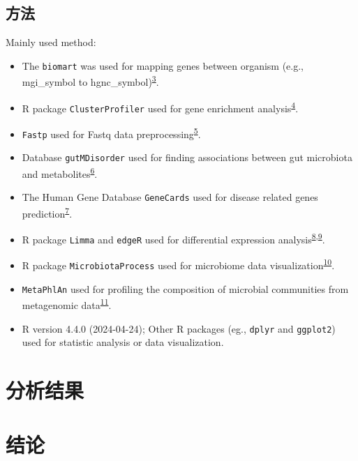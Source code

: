 \documentclass[
]{article}
\providecommand{\tightlist}{%
  \setlength{\itemsep}{0pt}\setlength{\parskip}{0pt}}
\begin{document}
\hypertarget{ux65b9ux6cd5}{%
\subsection{方法}\label{ux65b9ux6cd5}}

Mainly used method:

\begin{itemize}
\tightlist
\item
  The \texttt{biomart} was used for mapping genes between organism (e.g., mgi\_symbol to hgnc\_symbol)\textsuperscript{\protect\hyperlink{ref-MappingIdentifDurinc2009}{3}}.
\item
  R package \texttt{ClusterProfiler} used for gene enrichment analysis\textsuperscript{\protect\hyperlink{ref-ClusterprofilerWuTi2021}{4}}.
\item
  \texttt{Fastp} used for Fastq data preprocessing\textsuperscript{\protect\hyperlink{ref-UltrafastOnePChen2023}{5}}.
\item
  Database \texttt{gutMDisorder} used for finding associations between gut microbiota and metabolites\textsuperscript{\protect\hyperlink{ref-GutmdisorderACheng2019}{6}}.
\item
  The Human Gene Database \texttt{GeneCards} used for disease related genes prediction\textsuperscript{\protect\hyperlink{ref-TheGenecardsSStelze2016}{7}}.
\item
  R package \texttt{Limma} and \texttt{edgeR} used for differential expression analysis\textsuperscript{\protect\hyperlink{ref-LimmaPowersDiRitchi2015}{8},\protect\hyperlink{ref-EdgerDifferenChen}{9}}.
\item
  R package \texttt{MicrobiotaProcess} used for microbiome data visualization\textsuperscript{\protect\hyperlink{ref-MicrobiotaproceXuSh2023}{10}}.
\item
  \texttt{MetaPhlAn} used for profiling the composition of microbial communities from metagenomic data\textsuperscript{\protect\hyperlink{ref-ExtendingAndIBlanco2023}{11}}.
\item
  R version 4.4.0 (2024-04-24); Other R packages (eg., \texttt{dplyr} and \texttt{ggplot2}) used for statistic analysis or data visualization.
\end{itemize}

\hypertarget{results}{%
\section{分析结果}\label{results}}

\hypertarget{dis}{%
\section{结论}\label{dis}}
\end{document}

